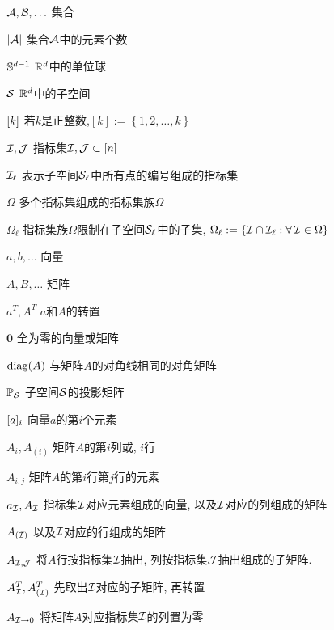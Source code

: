 \begin{denotation}
\item[\(\cA, \cB, \ldots\)] 集合
\item[\(|\cA|\)] 集合\(\cA\)中的元素个数
\item[\(\S^{d-1}\)] \(\R^d\)中的单位球
\item[\(\cS\)] \(\R^d\)中的子空间
\item[\([k\char"005D\)] 若\(k\)是正整数,\([k]:=\left\{ 1, 2, \ldots,k \right\}\)
\item[\(\cI, \cJ \)] 指标集\(\cI, \cJ \subset [n]\)
\item[\(\cI_\ell\)] 表示子空间\(\cS_\ell\)中所有点的编号组成的指标集
\item[\(\Omega\)] 多个指标集组成的指标集族\(\Omega\)
\item[\(\Omega_\ell\)] 指标集族\(\Omega\)限制在子空间\(\cS_\ell\)中的子集, \(\Omega_\ell:= \{\cI \cap \cI_\ell: \forall \, \cI \in \Omega\}\)

\item[\(a, b, \ldots\)] 向量
\item[\(A, B, \ldots\)] 矩阵 
\item[\(a^T, A^T\)] \(a\)和\(A\)的转置 
\item[\(\mathbf{0}\)] 全为零的向量或矩阵 
\item[\(\diag(A)\)] 与矩阵\(A\)的对角线相同的对角矩阵
\item[\(\P_\cS\)] 子空间\(\cS\)的投影矩阵
\item [\([a\char"005D_i \)] 向量\(a\)的第\(i\)个元素
\item[\(A_i, A_{(i)}\) ] 矩阵\(A\)的第\(i\)列或, \(i\)行
\item[\(A_{i, j}\) ] 矩阵\(A\)的第\(i\)行第\(j\)行的元素
\item[\(a_{\cI}, A_{\cI}\)] 指标集\(\cI\)对应元素组成的向量, 以及\(\cI\)对应的列组成的矩阵 
\item[\(A_{(\cI)}\)] 以及\(\cI\)对应的行组成的矩阵 
\item[\(A_{\cI, \cJ}\)] 将\(A\)行按指标集\(\cI\)抽出, 列按指标集\(\cJ\)抽出组成的子矩阵. 
\item[\(A_\cI^T, A_{(\cI)}^T\)] 先取出\(\cI\)对应的子矩阵, 再转置
\item[\(A_{\cI\rightarrow 0}\)] 将矩阵\(A\)对应指标集\(\cI\)的列置为零


\end{denotation}
